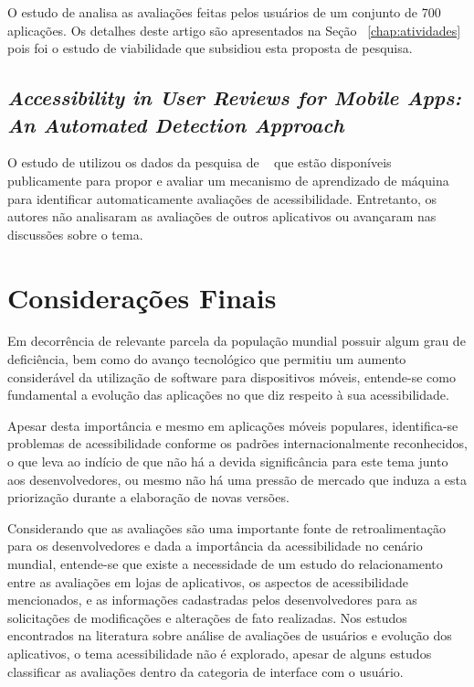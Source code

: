 O estudo de  analisa as avaliações feitas pelos usuários de um conjunto de 700 aplicações. Os detalhes deste artigo são apresentados na Seção~ \ref{chap:atividades} pois foi o estudo de viabilidade que subsidiou esta proposta de pesquisa.


\subsection{\textit{Accessibility in User Reviews for Mobile Apps: An Automated Detection Approach}}

O estudo de  utilizou os dados da pesquisa de ~ que estão disponíveis publicamente para propor e avaliar um mecanismo de aprendizado de máquina para identificar automaticamente avaliações de acessibilidade. Entretanto, os autores não analisaram as avaliações de outros aplicativos ou avançaram nas discussões sobre o tema.


\section{Considerações Finais}
Em decorrência de relevante parcela da população mundial possuir algum grau de deficiência, bem como do avanço tecnológico que permitiu um aumento considerável da utilização de software para dispositivos móveis, entende-se como fundamental a evolução das aplicações no que diz respeito à sua acessibilidade.

Apesar desta importância e mesmo em aplicações móveis populares, identifica-se problemas de acessibilidade conforme os padrões internacionalmente reconhecidos, o que leva ao indício de que não há a devida significância para este tema junto aos desenvolvedores, ou mesmo não há uma pressão de mercado que induza a esta priorização durante a elaboração de novas versões.

Considerando que as avaliações são uma importante fonte de retroalimentação para os desenvolvedores e dada a importância da acessibilidade no cenário mundial, entende-se que existe a necessidade de um estudo do relacionamento entre as avaliações em lojas de aplicativos, os aspectos de acessibilidade mencionados, e as informações cadastradas pelos desenvolvedores para as solicitações de modificações e alterações de fato realizadas. Nos estudos encontrados na literatura sobre análise de avaliações de usuários e evolução dos aplicativos, o tema acessibilidade não é explorado, apesar de alguns estudos classificar as avaliações dentro da categoria de interface com o usuário. 
